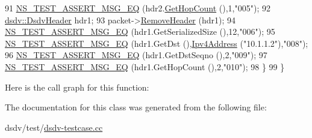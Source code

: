 \begin{DoxyCode}
91     \hyperlink{group__testing_ga2a9d78cffb3db8e867c35fff0b698cf5}{NS\_TEST\_ASSERT\_MSG\_EQ} (hdr2.\hyperlink{classns3_1_1dsdv_1_1DsdvHeader_a11f71dab9077edb26e02659b3a4d9a71}{GetHopCount} (),1,\textcolor{stringliteral}{"005"});
92     \hyperlink{classns3_1_1dsdv_1_1DsdvHeader}{dsdv::DsdvHeader} hdr1;
93     packet->\hyperlink{classns3_1_1Packet_a0961eccf975d75f902d40956c93ba63e}{RemoveHeader} (hdr1);
94     \hyperlink{group__testing_ga2a9d78cffb3db8e867c35fff0b698cf5}{NS\_TEST\_ASSERT\_MSG\_EQ} (hdr1.GetSerializedSize (),12,\textcolor{stringliteral}{"006"});
95     \hyperlink{group__testing_ga2a9d78cffb3db8e867c35fff0b698cf5}{NS\_TEST\_ASSERT\_MSG\_EQ} (hdr1.GetDst (),\hyperlink{classns3_1_1Ipv4Address}{Ipv4Address} (\textcolor{stringliteral}{"10.1.1.2"}),\textcolor{stringliteral}{"008"});
96     \hyperlink{group__testing_ga2a9d78cffb3db8e867c35fff0b698cf5}{NS\_TEST\_ASSERT\_MSG\_EQ} (hdr1.GetDstSeqno (),2,\textcolor{stringliteral}{"009"});
97     \hyperlink{group__testing_ga2a9d78cffb3db8e867c35fff0b698cf5}{NS\_TEST\_ASSERT\_MSG\_EQ} (hdr1.GetHopCount (),2,\textcolor{stringliteral}{"010"});
98   \}
99 \}
\end{DoxyCode}


Here is the call graph for this function\+:




The documentation for this class was generated from the following file\+:\begin{DoxyCompactItemize}
\item 
dsdv/test/\hyperlink{dsdv-testcase_8cc}{dsdv-\/testcase.\+cc}\end{DoxyCompactItemize}
